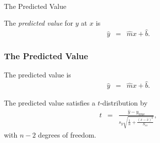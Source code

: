 \begin{frame}{The Predicted Value}

  \begin{definition}
    The \textit{predicted value} for $y$ at $x$ is
    \begin{eqnarray*}
      \hat{y} & = & \hat{m} x + \hat{b}.
    \end{eqnarray*}
  \end{definition}




  
\end{frame}

\begin{frame}
  \frametitle{The Predicted Value}

  The predicted value is 
  \begin{eqnarray*}
    \hat{y} & = & \hat{m} x + \hat{b}.
  \end{eqnarray*}


  The predicted value  satisfies a $t$-distribution by
  \begin{eqnarray*}
    t & = & \frac{\hat{y}-y_{\mathrm{true}}}{s_y \sqrt{\frac{1}{n}+\frac{(x-\bar{x})^2}{S_{xx}}}},
  \end{eqnarray*}
  with $n-2$ degrees of freedom.

\end{frame}


